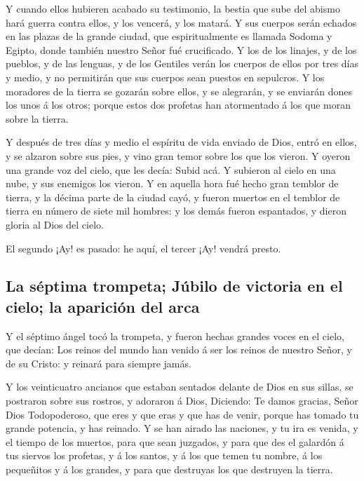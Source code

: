  Y cuando ellos hubieren acabado su testimonio, la bestia
que sube del abismo hará guerra contra ellos, y los vencerá, y los
matará.  Y sus cuerpos serán echados en las plazas de la
grande ciudad, que espiritualmente es llamada Sodoma y Egipto, donde
también nuestro Señor fué crucificado.  Y los de los
linajes, y de los pueblos, y de las lenguas, y de los Gentiles verán los
cuerpos de ellos por tres días y medio, y no permitirán que sus cuerpos
sean puestos en sepulcros.  Y los moradores de la tierra
se gozarán sobre ellos, y se alegrarán, y se enviarán dones los unos á
los otros; porque estos dos profetas han atormentado á los que moran
sobre la tierra.

 Y después de tres días y medio el espíritu de vida
enviado de Dios, entró en ellos, y se alzaron sobre sus pies, y vino
gran temor sobre los que los vieron.  Y oyeron una grande
voz del cielo, que les decía: Subid acá. Y subieron al cielo en una
nube, y sus enemigos los vieron.  Y en aquella hora fué
hecho gran temblor de tierra, y la décima parte de la ciudad cayó, y
fueron muertos en el temblor de tierra en número de siete mil hombres: y
los demás fueron espantados, y dieron gloria al Dios del cielo.

 El segundo ¡Ay! es pasado: he aquí, el tercer ¡Ay!
vendrá presto.

\hypertarget{la-suxe9ptima-trompeta-juxfabilo-de-victoria-en-el-cielo-la-apariciuxf3n-del-arca}{%
\subsection{La séptima trompeta; Júbilo de victoria en el cielo; la
aparición del
arca}\label{la-suxe9ptima-trompeta-juxfabilo-de-victoria-en-el-cielo-la-apariciuxf3n-del-arca}}

 Y el séptimo ángel tocó la trompeta, y fueron hechas
grandes voces en el cielo, que decían: Los reinos del mundo han venido á
ser los reinos de nuestro Señor, y de su Cristo: y reinará para siempre
jamás.

 Y los veinticuatro ancianos que estaban sentados delante
de Dios en sus sillas, se postraron sobre sus rostros, y adoraron á
Dios,  Diciendo: Te damos gracias, Señor Dios
Todopoderoso, que eres y que eras y que has de venir, porque has tomado
tu grande potencia, y has reinado.  Y se han airado las
naciones, y tu ira es venida, y el tiempo de los muertos, para que sean
juzgados, y para que des el galardón á tus siervos los profetas, y á los
santos, y á los que temen tu nombre, á los pequeñitos y á los grandes, y
para que destruyas los que destruyen la tierra.

